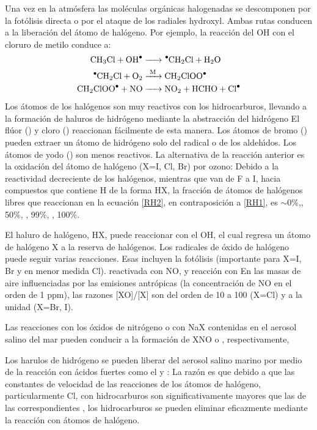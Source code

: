 Una vez en la atm\'osfera las mol\'eculas org\'anicas halogenadas se descomponen por la fot\'olisis directa o por el ataque de los radiales hydroxyl. Ambas rutas conducen a la liberaci\'on del \'atomo de hal\'ogeno. Por ejemplo, la reacci\'on del OH con el cloruro de metilo conduce a:
\begin{align*}
\ce{CH3Cl + OH^. &->  ^.CH2Cl + H2O \\
      ^.CH2Cl + O2 & ->[M] CH2ClOO^. \\
      CH2ClOO^. + NO & -> NO2 + HCHO + Cl^. }
\end{align*}
Los \'atomos de los hal\'ogenos son muy reactivos con los hidrocarburos, llevando a la formaci\'on de haluros de hidr\'ogeno mediante la abstracci\'on del hidr\'ogeno 
El fl\'uor () y cloro () reaccionan f\'acilmente de esta manera. Los \'atomos de bromo () pueden extraer un \'atomo de hidr\'ogeno solo del radical   o de los aldeh\'{\i}dos. Los \'atomos de yodo () son menos reactivos. La alternativa de la reacci\'on anterior es la oxidaci\'on del \'atomo de hal\'ogeno (X=I, Cl, Br) por ozono:
Debido a la reactividad decreciente de los hal\'ogenos, mientras que van de F a I, hacia compuestos que contiene H de la forma HX, la fracci\'on de \'atomos de hal\'ogenos libres que reaccionan en la ecuaci\'on \ref{RH2}, en contraposici\'on a \ref{RH1}, es $\sim$0\%,, 50\%, , 99\%, , 100\%.

El haluro de hal\'ogeno, HX, puede reaccionar con el OH,
el cual regresa un \'atomo de hal\'ogeno X a la reserva de hal\'ogenos. Los radicales de \'oxido de hal\'ogeno puede seguir varias reacciones. Esas incluyen la fot\'olisis (importante para X=I, Br y en menor medida Cl).
reactivada con NO,
y reacci\'on con 
En las masas de aire influenciadas por las emisiones antr\'opicas (la concentraci\'on de NO en el orden de 1 ppm), las razones [XO]/[X] son del orden de 10 a 100 (X=Cl) y a la unidad (X=Br, I).

Las reacciones con los \'oxidos de nitr\'ogeno  o  con NaX contenidas en el aerosol salino del mar pueden conducir a la formaci\'on de XNO o , respectivamente,

Los harulos de hidr\'ogeno se pueden liberar del aerosol salino marino por medio de la reacci\'on con \'acidos fuertes como el  y :
La raz\'on es que debido a que las constantes de velocidad de las reacciones de los \'atomos de hal\'ogeno, particularmente Cl, con hidrocarburos son significativamente mayores que las de las correspondientes , los hidrocarburos se pueden eliminar eficazmente mediante la reacci\'on con \'atomos de hal\'ogeno.


